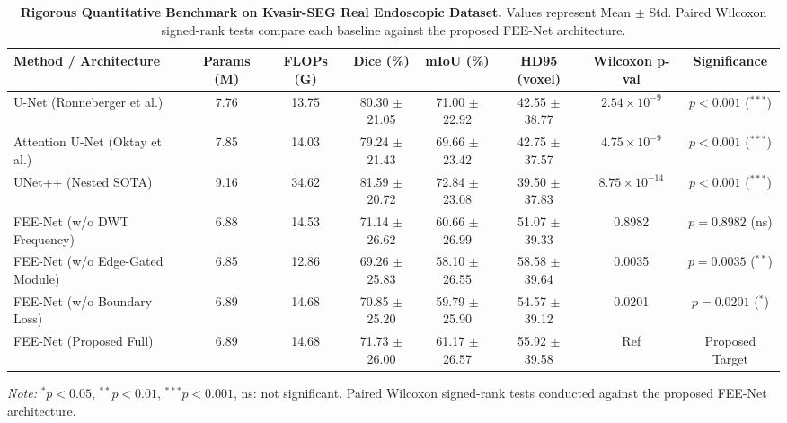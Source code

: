 \begin{table}[htbp]
\centering
\small
\caption{\textbf{Rigorous Quantitative Benchmark on Kvasir-SEG Real Endoscopic Dataset.} Values represent Mean $\pm$ Std. Paired Wilcoxon signed-rank tests compare each baseline against the proposed FEE-Net architecture.}
\label{tab:rigorous_evaluation}
\begin{tabular}{lccccccc}
\toprule
\textbf{Method / Architecture} & \textbf{Params (M)} & \textbf{FLOPs (G)} & \textbf{Dice (\%)} & \textbf{mIoU (\%)} & \textbf{HD95 (voxel)} & \textbf{Wilcoxon p-val} & \textbf{Significance} \\
\midrule
U-Net (Ronneberger et al.) & 7.76 & 13.75 & 80.30 $\pm$ 21.05 & 71.00 $\pm$ 22.92 & 42.55 $\pm$ 38.77 & $2.54 \times 10^{-9}$ & $p < 0.001$ ($^{***}$) \\
Attention U-Net (Oktay et al.) & 7.85 & 14.03 & 79.24 $\pm$ 21.43 & 69.66 $\pm$ 23.42 & 42.75 $\pm$ 37.57 & $4.75 \times 10^{-9}$ & $p < 0.001$ ($^{***}$) \\
UNet++ (Nested SOTA) & 9.16 & 34.62 & 81.59 $\pm$ 20.72 & 72.84 $\pm$ 23.08 & 39.50 $\pm$ 37.83 & $8.75 \times 10^{-14}$ & $p < 0.001$ ($^{***}$) \\
FEE-Net (w/o DWT Frequency) & 6.88 & 14.53 & 71.14 $\pm$ 26.62 & 60.66 $\pm$ 26.99 & 51.07 $\pm$ 39.33 & 0.8982 & $p = 0.8982$ (ns) \\
FEE-Net (w/o Edge-Gated Module) & 6.85 & 12.86 & 69.26 $\pm$ 25.83 & 58.10 $\pm$ 26.55 & 58.58 $\pm$ 39.64 & 0.0035 & $p = 0.0035$ ($^{**}$) \\
FEE-Net (w/o Boundary Loss) & 6.89 & 14.68 & 70.85 $\pm$ 25.20 & 59.79 $\pm$ 25.90 & 54.57 $\pm$ 39.12 & 0.0201 & $p = 0.0201$ ($^{*}$) \\
FEE-Net (Proposed Full) & 6.89 & 14.68 & 71.73 $\pm$ 26.00 & 61.17 $\pm$ 26.57 & 55.92 $\pm$ 39.58 & Ref & Proposed Target \\
\bottomrule
\end{tabular}
\vspace{1mm}
\begin{flushleft}
\footnotesize \textit{Note:} $^*p < 0.05$, $^{**}p < 0.01$, $^{***}p < 0.001$, ns: not significant. Paired Wilcoxon signed-rank tests conducted against the proposed FEE-Net architecture.
\end{flushleft}
\end{table}
